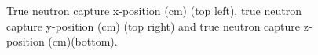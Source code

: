 \begin{figure}
\centering
    \begin{minipage}{0.5\linewidth}
    \end{minipage}%
    \begin{minipage}{0.5\linewidth}
    \centering
    \end{minipage}\par\medskip
    \centering
    
    \caption{True neutron capture x-position (cm) (top left), true neutron capture y-position (cm) (top right) and true neutron capture z-position (cm)(bottom).}
    \label{fig:TrueNCapPos}
\end{figure}


